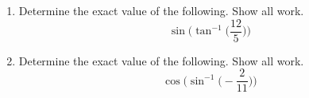 



\begin{enumerate}


\item  Determine the exact value of the following.  Show all work.
$$\sin\Big(\tan^{-1}\Big(\frac{12}{5}\Big)\Big)$$
\vfill
\item Determine the exact value of the following.  Show all work.
$$\cos\Big(\sin^{-1}\Big(-\frac{2}{11}\Big)\Big)$$
\vfill
\end{enumerate}



